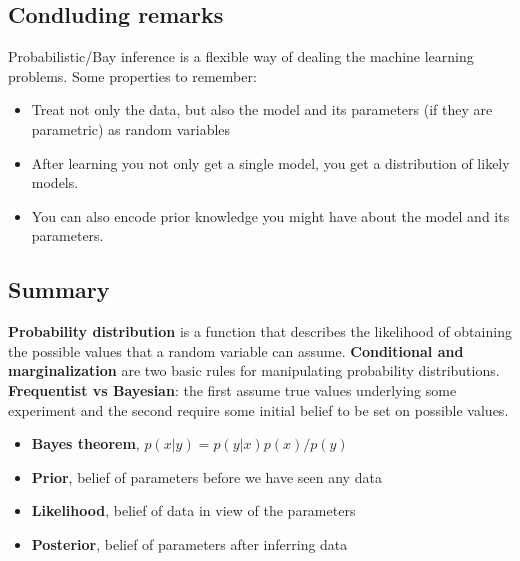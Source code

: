 \subsection{Condluding remarks}
Probabilistic/Bay inference is a flexible way of dealing the machine learning problems. Some properties to remember:

\begin{itemize}
    \item Treat not only the data, but also the model and its parameters (if they are parametric) as random variables
    \item After learning you not only get a single model, you get a distribution of likely models.
    \item You can also encode prior knowledge you might have about the model  and its parameters.
\end{itemize}

\subsection{Summary}
\textbf{Probability distribution} is a function that describes the likelihood of obtaining the possible values that a random variable can assume. \textbf{Conditional and marginalization} are two basic rules for manipulating probability distributions. \textbf{Frequentist vs Bayesian}: the first assume true values underlying some experiment and the second require some initial belief to be set on possible values.

\begin{itemize}
    \item \textbf{Bayes theorem}, $p(x|y) = p(y|x)p(x)/p(y)$
    \item \textbf{Prior}, belief of parameters before we have seen any data
    \item \textbf{Likelihood}, belief of data in view of the parameters
    \item \textbf{Posterior}, belief of parameters after inferring data
\end{itemize}







